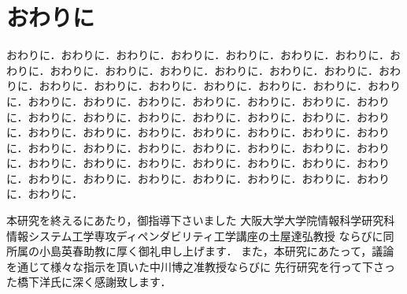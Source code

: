 \documentclass[11pt,a4j]{jreport}
\begin{document}
\chapter{おわりに}\label{chap:conclusion}
おわりに．おわりに．おわりに．おわりに．おわりに．おわりに．おわりに．おわりに．おわりに．おわりに．おわりに．おわりに．おわりに．おわりに．おわりに．おわりに．おわりに．おわりに．おわりに．おわりに．おわりに．おわりに．おわりに．おわりに．おわりに．おわりに．おわりに．おわりに．おわりに．おわりに．おわりに．おわりに．おわりに．おわりに．おわりに．おわりに．おわりに．おわりに．おわりに．おわりに．おわりに．おわりに．おわりに．おわりに．おわりに．おわりに．おわりに．おわりに．おわりに．おわりに．おわりに．おわりに．おわりに．おわりに．おわりに．おわりに．おわりに．おわりに．おわりに．おわりに．おわりに．おわりに．おわりに．おわりに．おわりに．

\acknowledgement%

本研究を終えるにあたり，御指導下さいました
大阪大学大学院情報科学研究科情報システム工学専攻ディペンダビリティ工学講座の土屋達弘教授
ならびに同所属の小島英春助教に厚く御礼申し上げます．
また，本研究にあたって，議論を通じて様々な指示を頂いた中川博之准教授ならびに
先行研究を行って下さった橋下洋氏に深く感謝致します．




%
%

\end{document}
